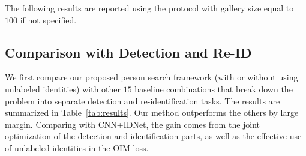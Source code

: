 \documentclass[10pt,twocolumn,letterpaper]{article}
\begin{document}
The following results are reported using the protocol with gallery size equal to $100$ if not specified.

\subsection{Comparison with Detection and Re-ID} %
\label{sub:comparison_with_detection_and_re_id}
We first compare our proposed person search framework (with or without using unlabeled identities) with other $15$ baseline combinations that break down the problem into separate detection and re-identification tasks. The results are summarized in Table~\ref{tab:results}. Our method outperforms the others by large margin. Comparing with CNN+IDNet, the gain comes from the joint optimization of the detection and identification parts, as well as the effective use of unlabeled identities in the OIM loss.
\end{document}
